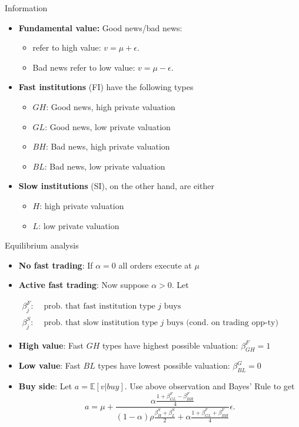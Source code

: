 \documentclass[english,10pt
,aspectratio=169
]{beamer}
\begin{document}
\begin{frame}{Information}
	\begin{itemize}
		\item \textbf{Fundamental value:} Good news/bad news:
		\begin{itemize}
			\item {} refer to high value: $v=\mu+\epsilon$.
			\item \alert{Bad news} refer to low value: $v=\mu-\epsilon$.
		\end{itemize}
		\item \textbf{Fast institutions} (FI) have the following types
		\begin{itemize}
			\item $GH$: Good news, high private valuation
			\item $GL$: Good news, low private valuation
			\item $BH$: Bad news, high private valuation
			\item $BL$: Bad news, low private valuation
		\end{itemize}
		\item \textbf{Slow institutions} (SI), on the other hand, are either
		\begin{itemize}
			\item $H$: high private valuation
			\item $L$: low private valuation
		\end{itemize}
	\end{itemize}
\end{frame}


\begin{frame}{Equilibrium analysis}
	\begin{itemize}
		\item \textbf{No fast trading}: If $\alpha=0$ all orders execute at $\mu$
		\item \textbf{Active fast trading}: Now suppose $\alpha>0$. Let
		\smallskip
		\begin{center}
			$
			\displaystyle
			\begin{aligned}
			\beta^{F}_{j}: & \text{ prob. that fast institution type $j$ buys} \\ 
			\beta^{S}_{j}: & \text{ prob. that slow institution type $j$ buys (cond. on trading opp-ty)} 
			\end{aligned}
			$
		\end{center}
		\item \textbf{High value}: Fast $GH$ types have highest possible valuation: $\beta^{F}_{GH}=1$
		\item \textbf{Low value}: Fast $BL$ types have lowest possible valuation: $\beta^{G}_{BL}=0$
		\item \textbf{Buy side}: Let $a  =\mathbb{E}[v|buy]$. Use above observation and Bayes' Rule to get
		\[a =\mu+\frac{\alpha\frac{1+\beta^{F}_{GL}-\beta^{F}_{BH}}{4}}{(1-\alpha)\rho\frac{\beta^{S}_{H}+\beta^{S}_{L}}{2}+\alpha\frac{1+\beta^{F}_{GL}+\beta^{F}_{BH}}{4}} \epsilon.
		\]
	\end{itemize}
\end{frame}
\end{document}
